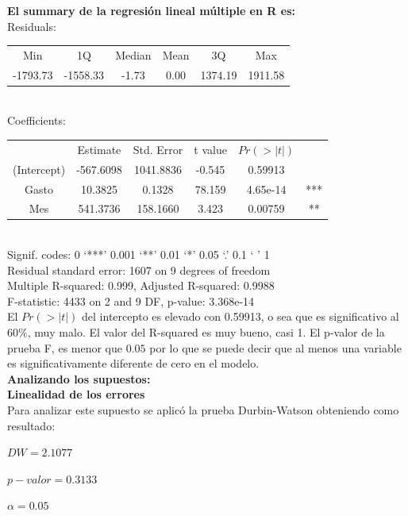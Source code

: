 \documentclass[12pt,a4paper]{article}
\begin{document}
	{\bf El summary de la regresión lineal múltiple en R es: }\\
	
	Residuals:\\
	
	\begin{tabular}{cccccc}
		Min&     1Q& Median& Mean&     3Q&    Max\\
		-1793.73&  -1558.33& -1.73&    0.00&   1374.19&   1911.58  
	\end{tabular}\\ 
	
	Coefficients:\\
	
	\begin{tabular}{cccccc}
		&     Estimate & Std. Error&     t value&   $Pr(>|t|)$&\\
		(Intercept) & -567.6098 & 1041.8836 &  -0.545  &  0.59913&\\
		Gasto      &   10.3825 &   0.1328  & 78.159  & 4.65e-14 &***\\
		Mes      &   541.3736 &   158.1660  & 3.423  & 0.00759 &**\\
	\end{tabular}\\
	
	Signif. codes:  0 ‘***’ 0.001 ‘**’ 0.01 ‘*’ 0.05 ‘.’ 0.1 ‘ ’ 1\\
	
	Residual standard error: 1607 on 9 degrees of freedom\\
	
	Multiple R-squared:  0.999,	Adjusted R-squared:  0.9988\\
	 
	F-statistic:  4433 on 2 and 9 DF,  p-value: 3.368e-14\\
	
	El $Pr(>|t|)$ del intercepto es elevado con 0.59913, o sea que es significativo al $60\%$, muy malo. El valor del R-squared es muy bueno, casi 1. El p-valor de la prueba F, es menor que $0.05$ por lo que se puede decir que al menos una variable es significativamente diferente de cero en el modelo.\\
	
	\textbf{Analizando los supuestos:}\\
	
	\textbf{Linealidad de los errores}\\
	Para analizar este supuesto se aplicó la prueba  Durbin-Watson obteniendo como resultado:
	
	\begin{center}
		$DW = 2.1077$
		
		$p-valor = 0.3133$
		
		$\alpha = 0.05$
	\end{center}
	
\end{document}
